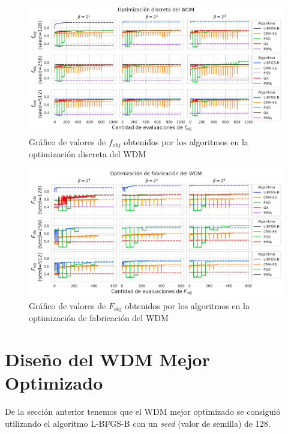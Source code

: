 \begin{landscape}
\begin{figure}[ht]
  \centering
  \includegraphics[scale=1.0]{image/results/wdm/wdm-opt-disc.png}
  \caption{Gráfico de valores de $f_{obj}$ obtenidos por los algoritmos en la optimización discreta del WDM}
  \label{fig:wdm-disc}
\end{figure}
\end{landscape}

\begin{landscape}
\begin{figure}[ht]
  \centering
  \includegraphics[scale=1.0]{image/results/wdm/wdm-opt-fab.png}
  \caption{Gráfico de valores de $F_{obj}$ obtenidos por los algoritmos en la optimización de fabricación del WDM}
  \label{fig:wdm-fab}
\end{figure}
\end{landscape}

\section{Diseño del WDM Mejor Optimizado}\label{sec:best-wdm}

De la sección anterior tenemos que el WDM mejor optimizado se consiguió
utilizando el algoritmo L-BFGS-B con un \emph{seed} (valor de semilla) de 128.

